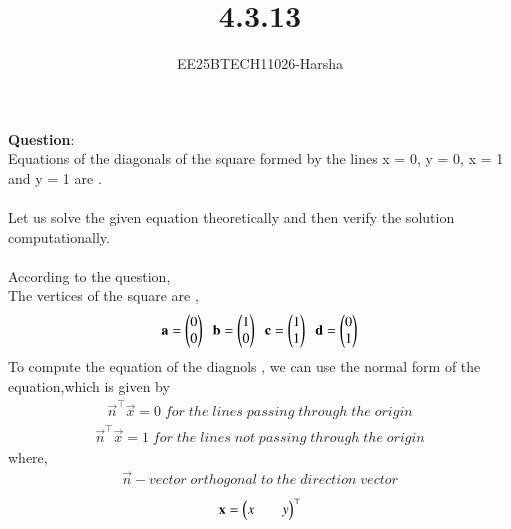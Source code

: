 \documentclass[journal]{IEEEtran}
\begin{document}

\vspace{3cm}

\title{4.3.13}
\author{EE25BTECH11026-Harsha}
 \maketitle
{\let\newpage\relax\maketitle}

\renewcommand{\thefigure}{\theenumi}
\renewcommand{\thetable}{\theenumi}
\setlength{\intextsep}{10pt} %


\renewcommand{\thetable}{\theenumi}

\textbf{Question}:\\
Equations of the diagonals of the square formed by the lines x = 0, y = 0, x = 1 and y = 1 are \underline{\hspace{2cm}}.\\
\solution \\
Let us solve the given equation theoretically and then verify the solution computationally.\\
\\
According to the question,\\
The vertices of the square are ,
\begin{align*}
    \mathbf{a}=\begin{pmatrix}0\\0\end{pmatrix}\;\;\mathbf{b}=\begin{pmatrix}1\\0\end{pmatrix}\;\;\mathbf{c}=\begin{pmatrix}1\\1\end{pmatrix}\;\;\mathbf{d}=\begin{pmatrix}0\\1\end{pmatrix}
\end{align*}
To compute the equation of the diagnols , we can use the normal form of the equation,which is given by
\begin{align*}
    \vec{n}^{\top}\vec{x}=0 \;for \;the \;lines \;passing\;through \;the \;origin
\end{align*}
\begin{align*}
    \vec{n}^{\top}\vec{x}=1 \;for \;the \;lines \;not \;passing\;through \;the \;origin
\end{align*}
where,\\
\begin{align*}
    \vec{n}-vector\; orthogonal\; to\; the\; direction\; vector
\end{align*}
\begin{align*}
    \mathbf{x}=\begin{pmatrix}x&&y\end{pmatrix}^{\top}
\end{align*}
\end{document}
